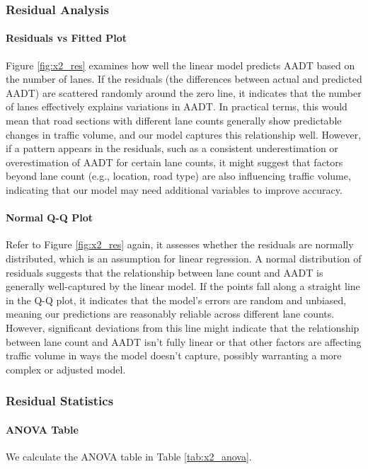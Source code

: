 \subsubsection{Residual Analysis}

\paragraph{Residuals vs Fitted Plot} Figure \ref{fig:x2_res}  examines how well the linear model predicts AADT based on the number of lanes. If the residuals (the differences between actual and predicted AADT) are scattered randomly around the zero line, it indicates that the number of lanes effectively explains variations in AADT. In practical terms, this would mean that road sections with different lane counts generally show predictable changes in traffic volume, and our model captures this relationship well. However, if a pattern appears in the residuals, such as a consistent underestimation or overestimation of AADT for certain lane counts, it might suggest that factors beyond lane count (e.g., location, road type) are also influencing traffic volume, indicating that our model may need additional variables to improve accuracy.

\paragraph{Normal Q-Q Plot} Refer to  Figure \ref{fig:x2_res}  again, it assesses whether the residuals are normally distributed, which is an assumption for linear regression. A normal distribution of residuals suggests that the relationship between lane count and AADT is generally well-captured by the linear model. If the points fall along a straight line in the Q-Q plot, it indicates that the model’s errors are random and unbiased, meaning our predictions are reasonably reliable across different lane counts. However, significant deviations from this line might indicate that the relationship between lane count and AADT isn’t fully linear or that other factors are affecting traffic volume in ways the model doesn’t capture, possibly warranting a more complex or adjusted model.

\subsubsection{Residual Statistics}

\paragraph{ANOVA Table} We calculate the ANOVA table in Table \ref{tab:x2_anova}.

